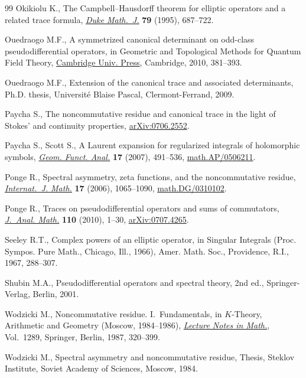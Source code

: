 \documentclass[11pt]{article}
\begin{document}
\begin{thebibliography}{99}
Okikiolu K., The {C}ampbell--{H}ausdorf\/f theorem for elliptic operators and a
  related trace formula, \href{http://dx.doi.org/10.1215/S0012-7094-95-07918-6}{\textit{Duke Math.~J.}} \textbf{79} (1995), 687--722.

Ouedraogo M.F., A symmetrized canonical determinant on odd-class
  pseudodif\/ferential operators, in Geo\-metric and Topological Methods for
  Quantum Field Theory, \href{http://dx.doi.org/10.1017/CBO9780511712135.012}{Cambridge Univ. Press}, Cambridge, 2010, 381--393.

Ouedraogo M.F., Extension of the canonical trace and associated determinants,
  Ph.D. thesis, Universit\'e Blaise Pascal, Clermont-Ferrand, 2009.


Paycha S., The noncommutative residue and canonical trace in the light of
  {S}tokes' and continuity properties, \href{http://arxiv.org/abs/0706.2552}{arXiv:0706.2552}.

Paycha S., Scott S., A {L}aurent expansion for regularized integrals of
  holomorphic symbols, \href{http://dx.doi.org/10.1007/s00039-007-0597-8}{\textit{Geom. Funct. Anal.}} \textbf{17} (2007),
  491--536, \href{http://arxiv.org/abs/math.AP/0506211}{math.AP/0506211}.

Ponge R., Spectral asymmetry, zeta functions, and the noncommutative residue,
  \href{http://dx.doi.org/10.1142/S0129167X06003825}{\textit{Internat.~J. Math.}} \textbf{17} (2006), 1065--1090,
  \href{http://arxiv.org/abs/math.DG/0310102}{math.DG/0310102}.

Ponge R., Traces on pseudodif\/ferential operators and sums of commutators,
  \href{http://dx.doi.org/10.1007/s11854-010-0001-8}{\textit{J.~Anal. Math.}} \textbf{110} (2010), 1--30, \href{http://arxiv.org/abs/0707.4265}{arXiv:0707.4265}.

Seeley R.T., Complex powers of an elliptic operator, in Singular {I}ntegrals
  ({P}roc. {S}ympos. {P}ure {M}ath., {C}hicago, {I}ll., 1966), Amer. Math.
  Soc., Providence, R.I., 1967, 288--307.

Shubin M.A., Pseudodif\/ferential operators and spectral theory, 2nd ed.,
  Springer-Verlag, Berlin, 2001.

Wodzicki M., Noncommutative residue. {I}.~{F}undamentals, in {$K$}-Theory,
  Arithmetic and Geo\-met\-ry ({M}oscow, 1984--1986), \href{http://dx.doi.org/10.1007/BFb0078372}{\textit{Lecture Notes in
  Math.}}, Vol.~1289, Springer, Berlin, 1987, 320--399.

Wodzicki M., Spectral asymmetry and noncommutative residue, Thesis, Steklov Institute, Soviet Academy of Sciences, Moscow, 1984.


\end{thebibliography}
\end{document}
